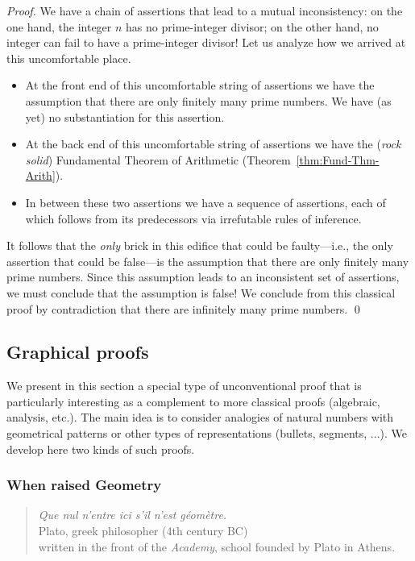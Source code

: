 \begin{proof}
We have a chain of assertions that lead to a mutual inconsistency: on
the one hand, the integer $n$ has no prime-integer divisor; on the
other hand, no integer can fail to have a prime-integer divisor!  Let
us analyze how we arrived at this uncomfortable place.
\begin{itemize}
\item
At the front end of this uncomfortable string of assertions we have
the assumption that there are only finitely many prime numbers.  We
have (as yet) no substantiation for this assertion.
\item
At the back end of this uncomfortable string of assertions we have
the ({\em rock solid}) Fundamental Theorem of Arithmetic
(Theorem~\ref{thm:Fund-Thm-Arith}).
\item
In between these two assertions we have a sequence of assertions, each
of which follows from its predecessors via irrefutable rules of
inference.
\end{itemize}
It follows that the {\em only} brick in this edifice that could be
faulty---i.e., the only assertion that could be false---is the
assumption that there are only finitely many prime numbers.  Since
this assumption leads to an inconsistent set of assertions, we must
conclude that the assumption is false!  We conclude from this
classical proof by contradiction that there are infinitely many prime
numbers.  \qed
\end{proof}



\subsection{Graphical proofs}
\label{sec:unconventionalproofs}


We present in this section a special type of unconventional proof
that is particularly interesting as a complement to more classical proofs (algebraic, analysis, etc.). 
The main idea is to consider analogies of natural numbers with geometrical patterns or other types of 
representations (bullets, segments, ...).
We develop here two kinds of such proofs. 

\subsubsection{When raised Geometry}

\begin{quote}
{\it Que nul n'entre ici s'il n'est g\'eom\`etre.} \\
\hspace*{2in} Plato, greek philosopher (4th century BC)\\
written in the front of the \textit{Academy}, school founded by Plato in Athens. 
\end{quote}
\medskip


